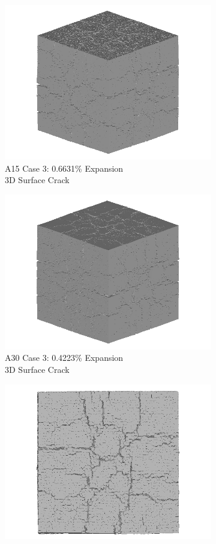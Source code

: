 \begin{figure}[ht!]
\centering

    \begin{subfigure}{.5\textwidth}
      \centering
      \includegraphics[width=.8\linewidth]{Files/exp_3D/DEF/A15X0C_3_3d.png}
    \caption{A15 Case 3: 0.6631\% Expansion \\ 3D Surface Crack}
    \end{subfigure}%
    \begin{subfigure}{.5\textwidth}
      \centering
      \includegraphics[width=.8\linewidth]{Files/exp_3D/DEF/A30X0C_3_3d.png}
    \caption{A30 Case 3: 0.4223\% Expansion\\ 3D Surface Crack}
    \end{subfigure}
    \begin{subfigure}{.5\textwidth}
      \centering
      \includegraphics[width=.8\linewidth]{Files/exp_3D/DEF/A15X0C_3_3ds.png}

\end{subfigure}
\end{figure}
